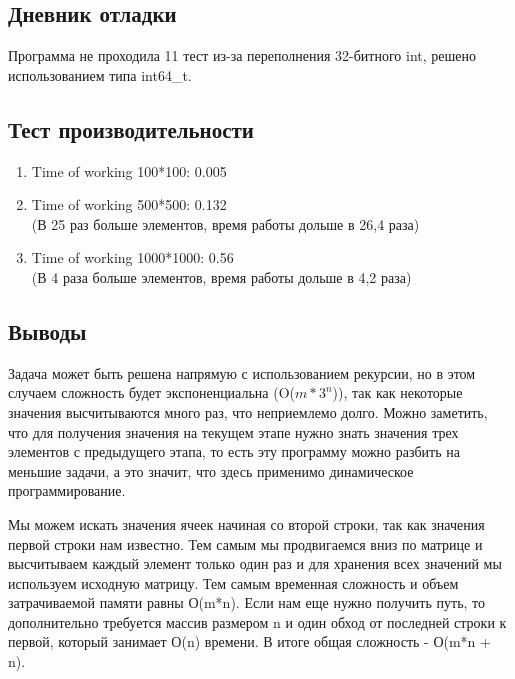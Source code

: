 \documentclass[12pt]{article}
\begin{document}
\subsection*{Дневник отладки}

Программа не проходила 11 тест из-за переполнения 32-битного int, решено использованием типа int64\_t.

\subsection*{Тест производительности}

\begin{enumerate}
	\item Time of working 100*100: 0.005
	\item Time of working 500*500: 0.132 \\
	(В 25 раз больше элементов, время работы дольше в 26,4 раза)
	\item Time of working 1000*1000: 0.56 \\
	 (В 4 раза больше элементов, время работы дольше в 4,2 раза)
	
\end{enumerate}
\subsection*{Выводы}
\par Задача может быть решена напрямую с использованием рекурсии, но в этом случаем сложность будет экспоненциальна (O($m*3^n$)), так как некоторые значения высчитываются много раз, что неприемлемо долго. Можно заметить, что для получения значения на текущем этапе нужно знать значения трех элементов с предыдущего этапа, то есть эту программу можно разбить на меньшие задачи, а это значит, что здесь применимо динамическое программирование. 
\par Мы можем искать значения ячеек начиная со второй строки, так как значения первой строки нам известно. Тем самым мы продвигаемся вниз по матрице и высчитываем каждый элемент только один раз и для хранения всех значений мы используем исходную матрицу. Тем самым временная сложность и объем затрачиваемой памяти равны О(m*n). Если нам еще нужно получить путь, то дополнительно требуется массив размером n и один обход от последней строки к первой, который занимает О(n) времени. В итоге общая сложность - О(m*n + n).
\end{document}
